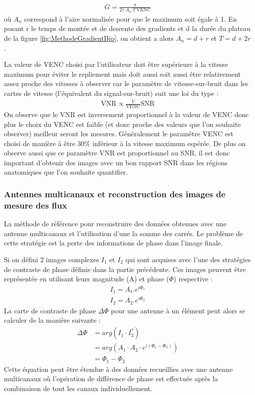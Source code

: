 \begin{align}
G = \frac{\pi}{2 \gamma \ A_n \ T \ \text{VENC}}
\end{align}
où $A_n$ correspond à l'aire normalisée pour que le maximum soit égale à 1. En posant r le temps de montée et de descente des gradients et d la durée du plateau de la figure \ref{fig:MethodeGradientBip}, on obtient a alors $A_n = d+r$ et $T = d+2r$.

La valeur de VENC choisi par l'utilisateur doit être supérieure à la vitesse maximum pour éviter le repliement mais doit aussi soit aussi être relativement assez proche des vitesses à observer car le paramètre de vitesse-sur-bruit dans les cartes de vitesse (l'équivalent du signal-sur-bruit) suit une loi du type :
\begin{align}
\text{VNR} \propto \frac{V}{\text{VENC}}\text{SNR}
\end{align}
On observe que le VNR est inversement proportionnel  à la valeur de VENC donc plus le choix du VENC est faible (et donc proche des valeurs que l'on souhaite observer) meilleur seront les mesures. Généralement le paramètre VENC est choisi de manière à être 30$\%$ inférieur à la vitesse maximum espérée. De plus on observe aussi que ce paramètre VNR est proportionnel au SNR, il est donc important d'obtenir des images avec un bon rapport SNR dans les régions anatomiques que l'on souhaite quantifier.

\subsubsection{Antennes multicanaux et reconstruction des images de mesure des flux}

La méthode de référence pour reconstruire des données obtenues avec une antenne multicanaux et l'utilisation d'une la somme des carrés. Le problème de cette stratégie est la perte des informations de phase dans l'image finale.

Si on défini 2 images complexes $I_1$ et $I_2$ qui sont acquises avec l'une des stratégies de contraste de phase définie dans la partie précédente. Ces images peuvent être représentée en utilisant leurs magnitude (A) et phase ($\Phi$) respective :
\begin{equation}
\begin{split}
I_1= A_1 . e^{i \Phi_1} \\
I_2= A_2 . e^{i \Phi_2}
\end{split}
\end{equation}
La carte de contraste de phase $\Delta \Phi$ pour une antenne à un élément peut alors se calculer de la manière suivante :
\begin{equation}
\begin{split}
\Delta \Phi &= arg(I_1 \cdot I_2^*) \\
				  &= arg(A_1 \cdot A_2 \cdot e^{i(\Phi_1 - \Phi_2)}) \\
				  &= \Phi_1-\Phi_2
\end{split}
\end{equation}
Cette équation peut être étendue à des données recueillies avec une antenne multicanaux où l'opération de différence de phase est effectuée après la combinaison de tout les canaux individuellement.

